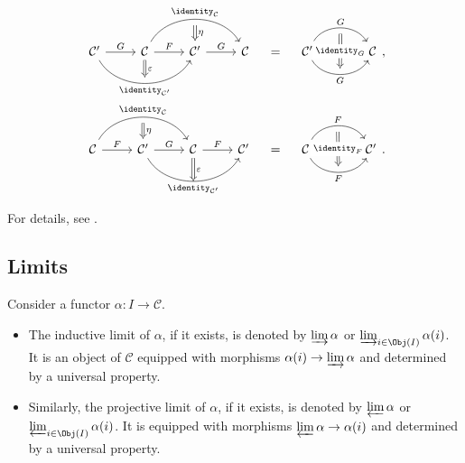 \begin{equation*}\begin{gathered}
	\begin{tikzcd}
		\mathcal{C}' \arrow[r, "G"] \arrow[rr, bend right=60, "\identity_{\mathcal{C}'}"', "" {name=B}] & \mathcal{C} \arrow[r, "F"] \arrow[Rightarrow, to=B, "\varepsilon"] \arrow[rr, bend left=60, "\identity_{\mathcal{C}}", ""' {name=T}] & \mathcal{C}' \arrow[r, "G"] \arrow[Rightarrow, from=T, "\eta"] & \mathcal{C}
	\end{tikzcd} \quad = \quad \begin{tikzcd}[column sep=large]
		\mathcal{C}' \arrow[r, bend left=60, "G", ""' {name=T}] \arrow[r, bend right=60, "G"', "" {name=B}] & \mathcal{C} \arrow[Rightarrow, from=T, to=B, "{\identity_G}" description]
	\end{tikzcd} , \\
	\begin{tikzcd}
		\mathcal{C} \arrow[r, "F"] \arrow[rr, bend left=60, "\identity_{\mathcal{C}}", ""' {name=T}] & \mathcal{C}' \arrow[r, "G"] \arrow[Rightarrow, from=T, "\eta"] \arrow[rr, bend right=60, "\identity_{\mathcal{C}'}"', ""' {name=B}] & \mathcal{C} \arrow[r, "F"] \arrow[Rightarrow, to=B, "\varepsilon"] & \mathcal{C}'
	\end{tikzcd} \quad = \quad \begin{tikzcd}[column sep=large]
		\mathcal{C} \arrow[r, bend left=60, "F", ""' {name=T}] \arrow[r, bend right=60, "F"', "" {name=B}] & \mathcal{C}' \arrow[Rightarrow, from=T, to=B, "{\identity_F}" description]
	\end{tikzcd}.
\end{gathered}\end{equation*}

For details, see \cite[Remark~2.6.6]{Li1}.

\subsection*{Limits}

Consider a functor $\alpha:I\to\mathcal C$.

\begin{itemize}
	\item The inductive limit of $\alpha$, if it exists, is denoted by $\varinjlim\alpha$ or $\varinjlim_{i\in\Obj(I)}\alpha(i)$. It is an object of $\mathcal C$ equipped with morphisms $\alpha(i)\to\varinjlim\alpha$ and determined by a universal property.
	\item Similarly, the projective limit of $\alpha$, if it exists, is denoted by $\varprojlim\alpha$ or $\varprojlim_{i\in\Obj(I)}\alpha(i)$. It is equipped with morphisms $\varprojlim\alpha\to\alpha(i)$ and determined by a universal property.
\end{itemize}

